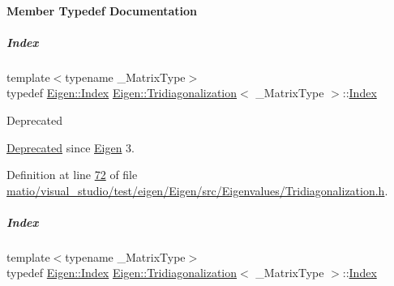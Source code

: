 \paragraph{Member Typedef Documentation}
\mbox{\label{group___eigenvalues___module_a7bd1f9fccec1e93b77a2214b2d30aae9}} 
\subparagraph{\texorpdfstring{Index}{Index}\hspace{0.1cm}{\footnotesize\ttfamily [1/2]}}
{\footnotesize\ttfamily template$<$typename \+\_\+\+Matrix\+Type$>$ \\
typedef \hyperlink{namespace_eigen_a62e77e0933482dafde8fe197d9a2cfde}{Eigen\+::\+Index} \hyperlink{group___eigenvalues___module_class_eigen_1_1_tridiagonalization}{Eigen\+::\+Tridiagonalization}$<$ \+\_\+\+Matrix\+Type $>$\+::\hyperlink{group___eigenvalues___module_a7bd1f9fccec1e93b77a2214b2d30aae9}{Index}}

\begin{DoxyRefDesc}{Deprecated}
\item[\hyperlink{deprecated__deprecated000068}{Deprecated}]since \hyperlink{namespace_eigen}{Eigen} 3. \end{DoxyRefDesc}


Definition at line \hyperlink{matio_2visual__studio_2test_2eigen_2_eigen_2src_2_eigenvalues_2_tridiagonalization_8h_source_l00072}{72} of file \hyperlink{matio_2visual__studio_2test_2eigen_2_eigen_2src_2_eigenvalues_2_tridiagonalization_8h_source}{matio/visual\+\_\+studio/test/eigen/\+Eigen/src/\+Eigenvalues/\+Tridiagonalization.\+h}.

\mbox{\label{group___eigenvalues___module_a7bd1f9fccec1e93b77a2214b2d30aae9}} 
\subparagraph{\texorpdfstring{Index}{Index}\hspace{0.1cm}{\footnotesize\ttfamily [2/2]}}
{\footnotesize\ttfamily template$<$typename \+\_\+\+Matrix\+Type$>$ \\
typedef \hyperlink{namespace_eigen_a62e77e0933482dafde8fe197d9a2cfde}{Eigen\+::\+Index} \hyperlink{group___eigenvalues___module_class_eigen_1_1_tridiagonalization}{Eigen\+::\+Tridiagonalization}$<$ \+\_\+\+Matrix\+Type $>$\+::\hyperlink{group___eigenvalues___module_a7bd1f9fccec1e93b77a2214b2d30aae9}{Index}}

